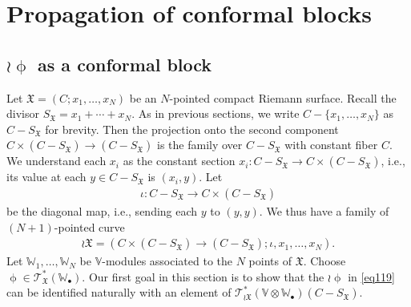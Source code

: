 \documentclass[12pt,a4paper,notitlepage]{report}
\theoremstyle{definition}
\theoremstyle{plain}
\newcommand{\fk}{\mathfrak}
\newcommand{\scr}{\mathscr}
\newcommand{\blt}{\bullet}
\newcommand{\Vbb}{\mathbb V}
\newcommand{\Wbb}{\mathbb W}
\numberwithin{equation}{section}
\begin{document}
\section{Propagation of conformal blocks}\label{lb149}



\subsection*{$\wr\upphi$ as a conformal block}


Let $\fk X=(C;x_1,\dots,x_N)$ be an $N$-pointed compact Riemann surface. Recall the divisor $S_{\fk X}=x_1+\cdots+x_N$. As in previous sections, we write $C-\{x_1,\dots,x_N\}$ as $C-S_{\fk X}$ for brevity. Then the projection onto the second component $C\times(C-S_{\fk X})\rightarrow (C-S_{\fk X})$ is the family over $C-S_{\fk X}$ with constant  fiber $C$. We understand each $x_i$ as the constant section $x_i:C-S_{\fk X}\rightarrow C\times (C-S_{\fk X})$, i.e., its value at each $y\in C-S_{\fk X}$ is $(x_i,y)$. Let
\begin{align*}
\iota:C-S_{\fk X}\rightarrow C\times (C-S_{\fk X})
\end{align*}
be the diagonal map, i.e., sending each $y$ to $(y,y)$. We thus have a family of $(N+1)$-pointed curve \index{X@$\wr\fk X,\wr\wr\fk X$}
\begin{gather}
\wr\fk X=(C\times(C-S_{\fk X})\rightarrow (C-S_{\fk X});\iota,x_1,\dots,x_N).
\end{gather}
Let $\Wbb_1,\dots,\Wbb_N$ be $\Vbb$-modules associated to the $N$ points of $\fk X$. Choose $\upphi\in\scr T_{\fk X}^*(\Wbb_\blt)$. Our first goal in this section is to show that the $\wr\upphi$  in \eqref{eq119} can be identified naturally with an element of $\scr T_{\wr\fk X}^*(\Vbb\otimes\Wbb_\blt)(C-S_{\fk X})$. 
\end{document}
